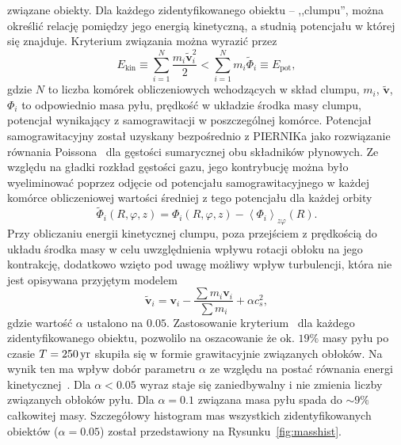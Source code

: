 związane obiekty. Dla każdego zidentyfikowanego obiektu -- ,,clumpu'', można
określić relację pomiędzy jego energią kinetyczną, a studnią potencjału w której
się znajduje. Kryterium związania można wyrazić przez
\begin{equation}
   \label{eq:bcrit}
   E_{\textrm{kin}} \equiv \sum\limits_{i=1}^N \frac{m_i\tilde{\mathbf{v}}_i^2}{2} 
   < \sum\limits_{i=1}^N m_i\tilde{\Phi}_i \equiv E_{\textrm{pot}},
\end{equation}
gdzie $N$ to liczba komórek obliczeniowych wchodzących w skład clumpu, $m_i$,
$\tilde{\mathbf{v}}$, $\Phi_i$ to odpowiednio masa pyłu, prędkość w układzie
środka masy clumpu, potencjał wynikający z samograwitacji w poszczególnej
komórce. Potencjał samograwitacyjny został uzyskany bezpośrednio z PIERNIKa jako
rozwiązanie równania Poissona~ dla gęstości sumarycznej obu
składników płynowych. Ze względu na gładki rozkład gęstości gazu, jego
kontrybucję można było wyeliminować poprzez odjęcie od potencjału
samograwitacyjnego w każdej komórce obliczeniowej wartości średniej z tego
potencjału dla każdej orbity
\begin{equation}
   \tilde{\Phi}_i(R,\varphi,z) = \Phi_i(R,\varphi,z) -
   \left<\Phi_i\right>_{z\varphi}(R).
\end{equation}
%
Przy obliczaniu energii kinetycznej clumpu, poza przejściem z prędkością do układu środka
masy w celu uwzględnienia wpływu rotacji obłoku na jego kontrakcję, dodatkowo
wzięto pod uwagę możliwy wpływ turbulencji, która nie jest opisywana przyjętym
modelem
\begin{equation}
   \label{eq:ekin}
   \tilde{\mathbf{v}}_i = \mathbf{v}_i - \frac{\sum m_i \mathbf{v}_i}{\sum m_i}
   + \alpha c_s^2,
\end{equation}
gdzie wartość $\alpha$ ustalono na $0.05$. Zastosowanie
kryterium~ dla każdego zidentyfikowanego obiektu, pozwolilo na
oszacowanie że ok. $19\%$ masy pyłu po czasie $T = 250\hbox{$\thinspace\textrm{yr}$}$ skupiła się w formie
grawitacyjnie związanych obłoków. Na wynik ten ma wpływ dobór parametru $\alpha$
ze względu na postać równania energi kinetycznej~. Dla $\alpha <
0.05$ wyraz staje się zaniedbywalny i nie zmienia liczby związanych obłoków
pyłu. Dla $\alpha = 0.1$ związana masa pyłu spada do $\sim 9\%$ całkowitej masy.
Szczegółowy histogram mas wszystkich zidentyfikowanych obiektów ($\alpha =
0.05$) został przedstawiony na Rysunku~\ref{fig:masshist}.
